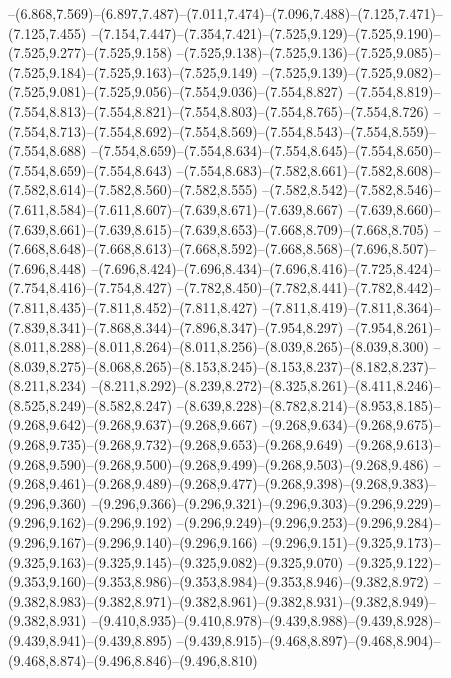   --(6.868,7.569)--(6.897,7.487)--(7.011,7.474)--(7.096,7.488)--(7.125,7.471)--(7.125,7.455)%
  --(7.154,7.447)--(7.354,7.421)--(7.525,9.129)--(7.525,9.190)--(7.525,9.277)--(7.525,9.158)%
  --(7.525,9.138)--(7.525,9.136)--(7.525,9.085)--(7.525,9.184)--(7.525,9.163)--(7.525,9.149)%
  --(7.525,9.139)--(7.525,9.082)--(7.525,9.081)--(7.525,9.056)--(7.554,9.036)--(7.554,8.827)%
  --(7.554,8.819)--(7.554,8.813)--(7.554,8.821)--(7.554,8.803)--(7.554,8.765)--(7.554,8.726)%
  --(7.554,8.713)--(7.554,8.692)--(7.554,8.569)--(7.554,8.543)--(7.554,8.559)--(7.554,8.688)%
  --(7.554,8.659)--(7.554,8.634)--(7.554,8.645)--(7.554,8.650)--(7.554,8.659)--(7.554,8.643)%
  --(7.554,8.683)--(7.582,8.661)--(7.582,8.608)--(7.582,8.614)--(7.582,8.560)--(7.582,8.555)%
  --(7.582,8.542)--(7.582,8.546)--(7.611,8.584)--(7.611,8.607)--(7.639,8.671)--(7.639,8.667)%
  --(7.639,8.660)--(7.639,8.661)--(7.639,8.615)--(7.639,8.653)--(7.668,8.709)--(7.668,8.705)%
  --(7.668,8.648)--(7.668,8.613)--(7.668,8.592)--(7.668,8.568)--(7.696,8.507)--(7.696,8.448)%
  --(7.696,8.424)--(7.696,8.434)--(7.696,8.416)--(7.725,8.424)--(7.754,8.416)--(7.754,8.427)%
  --(7.782,8.450)--(7.782,8.441)--(7.782,8.442)--(7.811,8.435)--(7.811,8.452)--(7.811,8.427)%
  --(7.811,8.419)--(7.811,8.364)--(7.839,8.341)--(7.868,8.344)--(7.896,8.347)--(7.954,8.297)%
  --(7.954,8.261)--(8.011,8.288)--(8.011,8.264)--(8.011,8.256)--(8.039,8.265)--(8.039,8.300)%
  --(8.039,8.275)--(8.068,8.265)--(8.153,8.245)--(8.153,8.237)--(8.182,8.237)--(8.211,8.234)%
  --(8.211,8.292)--(8.239,8.272)--(8.325,8.261)--(8.411,8.246)--(8.525,8.249)--(8.582,8.247)%
  --(8.639,8.228)--(8.782,8.214)--(8.953,8.185)--(9.268,9.642)--(9.268,9.637)--(9.268,9.667)%
  --(9.268,9.634)--(9.268,9.675)--(9.268,9.735)--(9.268,9.732)--(9.268,9.653)--(9.268,9.649)%
  --(9.268,9.613)--(9.268,9.590)--(9.268,9.500)--(9.268,9.499)--(9.268,9.503)--(9.268,9.486)%
  --(9.268,9.461)--(9.268,9.489)--(9.268,9.477)--(9.268,9.398)--(9.268,9.383)--(9.296,9.360)%
  --(9.296,9.366)--(9.296,9.321)--(9.296,9.303)--(9.296,9.229)--(9.296,9.162)--(9.296,9.192)%
  --(9.296,9.249)--(9.296,9.253)--(9.296,9.284)--(9.296,9.167)--(9.296,9.140)--(9.296,9.166)%
  --(9.296,9.151)--(9.325,9.173)--(9.325,9.163)--(9.325,9.145)--(9.325,9.082)--(9.325,9.070)%
  --(9.325,9.122)--(9.353,9.160)--(9.353,8.986)--(9.353,8.984)--(9.353,8.946)--(9.382,8.972)%
  --(9.382,8.983)--(9.382,8.971)--(9.382,8.961)--(9.382,8.931)--(9.382,8.949)--(9.382,8.931)%
  --(9.410,8.935)--(9.410,8.978)--(9.439,8.988)--(9.439,8.928)--(9.439,8.941)--(9.439,8.895)%
  --(9.439,8.915)--(9.468,8.897)--(9.468,8.904)--(9.468,8.874)--(9.496,8.846)--(9.496,8.810)%

